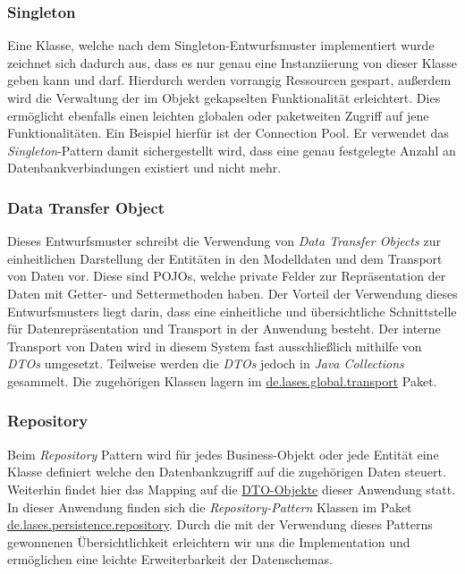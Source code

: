 \subsubsection{Singleton}
Eine Klasse, welche nach dem Singleton-Entwurfsmuster implementiert wurde zeichnet
sich dadurch aus, dass es nur genau eine Instanziierung von dieser Klasse geben
kann und darf. Hierdurch werden vorrangig Ressourcen gespart, außerdem wird die
Verwaltung der im Objekt gekapselten Funktionalität erleichtert. Dies ermöglicht ebenfalls einen
leichten globalen oder paketweiten Zugriff auf jene Funktionalitäten.
Ein Beispiel hierfür ist der Connection Pool. Er verwendet das \emph{Singleton}-Pattern
damit sichergestellt wird, dass
eine genau festgelegte Anzahl an Datenbankverbindungen existiert und nicht mehr.

\subsubsection{Data Transfer Object}
Dieses Entwurfsmuster schreibt die Verwendung von \emph{Data Transfer Objects}
zur einheitlichen Darstellung der Entitäten in den Modelldaten und dem Transport
von Daten vor.
Diese sind POJOs, welche private Felder zur Repräsentation der Daten mit Getter- und
Settermethoden haben.
Der Vorteil der Verwendung dieses Entwurfsmusters liegt darin, dass eine
einheitliche und übersichtliche Schnittstelle für Datenrepräsentation und Transport
in der Anwendung besteht.
Der interne Transport von Daten wird in diesem System fast ausschließlich mithilfe von \emph{DTOs}
umgesetzt. Teilweise werden die \emph{DTOs} jedoch in \emph{Java Collections} gesammelt.
Die zugehörigen Klassen lagern im
\hyperref[arch:transport]{de.lases.global.transport} Paket.

\subsubsection{Repository}
Beim \emph{Repository} Pattern wird für jedes Business-Objekt oder jede Entität
eine Klasse definiert welche den Datenbankzugriff auf die zugehörigen Daten steuert.
Weiterhin findet hier das Mapping auf die \hyperref[arch:transport]{DTO-Objekte} dieser Anwendung statt.
In dieser Anwendung finden sich die \emph{Repository-Pattern} Klassen im Paket
\hyperref[arch:repository]{de.lases.persistence.repository}. Durch die mit
der Verwendung dieses Patterns gewonnenen Übersichtlichkeit erleichtern wir uns die
Implementation und ermöglichen eine leichte Erweiterbarkeit der Datenschemas.

